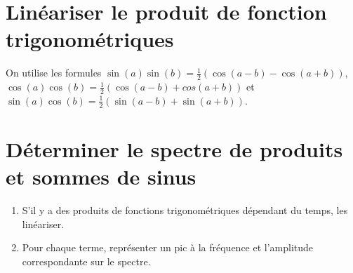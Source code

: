\section{Linéariser le produit de fonction trigonométriques}

On utilise les formules $\sin(a)\sin(b)=\frac{1}{2}\left(\cos(a-b)-\cos(a+b)\right)$, $\cos(a)\cos(b)=\frac{1}{2}\left(\cos(a-b)+cos(a+b)\right)$ et $\sin(a)\cos(b)=\frac{1}{2}\left(\sin(a-b)+\sin(a+b)\right)$.

\section{Déterminer le spectre de produits et sommes de sinus}
\begin{enumerate}
    \item S'il y a des produits de fonctions trigonométriques dépendant du temps, les linéariser.
    \item Pour chaque terme, représenter un pic à la fréquence et l'amplitude correspondante sur le spectre.
\end{enumerate}

